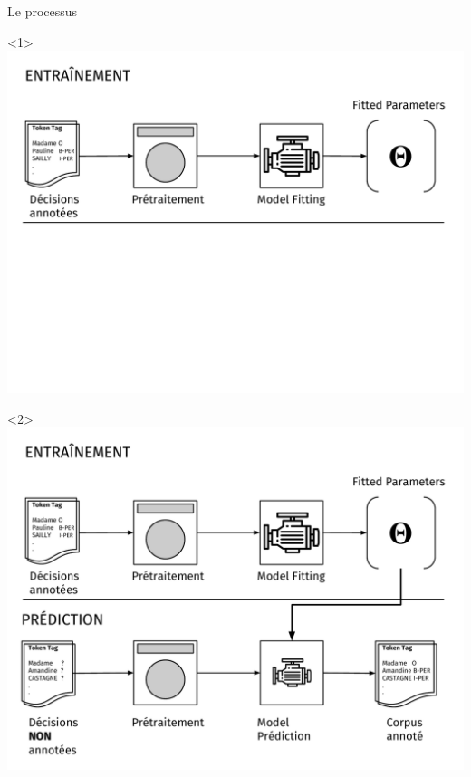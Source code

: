 \documentclass[10pt]{beamer}
\begin{document}
\begin{frame}{Le processus}
\begin{onlyenv}<1>\vspace*{\fill}\includegraphics[width=1\linewidth]{"img/flow_ds"}\vspace*{\fill}\end{onlyenv}		\begin{onlyenv}\vspace*{\fill}\includegraphics[width=1\linewidth]{"img/flow_ds2"}\vspace*{\fill}\end{onlyenv}
\end{frame}
\end{document}
